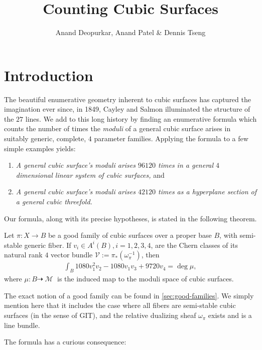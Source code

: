 \documentclass[12pt,reqno]{amsart}
\title{Counting Cubic Surfaces}
\author{Anand Deopurkar, Anand Patel
  \& Dennis Tseng}
\DeclareMathOperator{\M}{\mathcal{M}}
\renewcommand{\to}{{\longrightarrow}}
\numberwithin{equation}{section}
\newcommand{\V}{\mathcal V}
\begin{document}
\maketitle

\section{Introduction}
\label{sec:intro}

The beautiful enumerative geometry inherent to cubic surfaces has
captured the imagination ever since, in 1849, Cayley and Salmon
illuminated the structure of the $27$ lines.  We add to this long
history by finding an enumerative formula which counts the number of
times the {\sl moduli} of a general cubic surface arises in suitably
generic, complete, $4$ parameter families. Applying the formula to a
few simple examples yields:
\begin{enumerate}
\item[(A)] \label{fact:RanestadSturmfelds} {\sl A general cubic
    surface's moduli arises $96120$ times in a general $4$ dimensional
    linear system of cubic surfaces,} and
\item[(B)] {\sl A general cubic surface's moduli arises $42120$ times
    as a hyperplane section of a general cubic threefold.}
\end{enumerate}

Our formula, along with its precise hypotheses, is stated in the
following theorem.

\begin{theorem}\label{theorem:main}
  Let $\pi: X \to B$ be a good family of cubic surfaces over a proper
  base $B$, with semi-stable generic fiber. If
  $v_{i} \in A^{i}(B), i=1, 2,3, 4$, are the Chern classes of its
  natural rank $4$ vector bundle $\V := \pi_{*}(\omega_{\pi}^{-1})$,
  then
  \begin{align}
    \label{eq:MAIN}
   \int_{B} 1080v_{1}^{2}v_{2} - 1080v_{1}v_{3}+9720v_{4} = \deg \mu,
  \end{align}
  where $\mu: B \dashrightarrow \M$ is the induced map to the moduli
  space of cubic surfaces.
\end{theorem}

The exact notion of a good family can be found in
\autoref{sec:good-families}.  We simply mention here that it includes
the case where all fibers are semi-stable cubic surfaces (in the sense
of GIT), and the relative dualizing sheaf $\omega_{\pi}$ exists and is
a line bundle.

The formula has a curious consequence:
\end{document}

